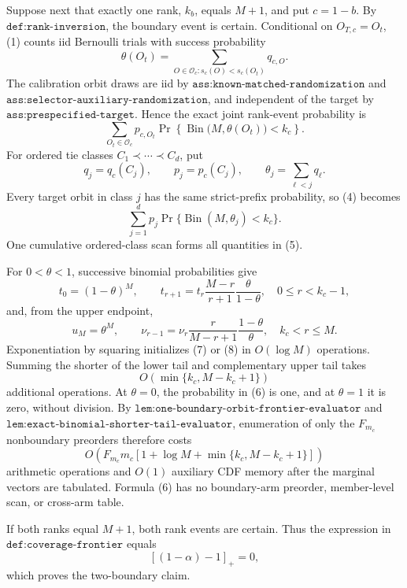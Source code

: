 Suppose next that exactly one rank, \(k_b\), equals \(M+1\), and put \(c=1-b\). By \(\texttt{def:rank-inversion}\), the boundary event is certain. Conditional on \(O_{T,c}=O_t\), (1) counts iid Bernoulli trials with success probability
\[
\theta(O_t)
=
\sum_{O\in\mathcal O_c:s_c(O)<s_c(O_t)}
q_{c,O}.
\tag{3}
\]
The calibration orbit draws are iid by \(\texttt{ass:known-matched-randomization}\) and \(\texttt{ass:selector-auxiliary-randomization}\), and independent of the target by \(\texttt{ass:prespecified-target}\). Hence the exact joint rank-event probability is
\[
\sum_{O_t\in\mathcal O_c}
p_{c,O_t}
\Pr\!\left\{
\operatorname{Bin}\bigl(M,\theta(O_t)\bigr)<k_c
\right\}.
\tag{4}
\]
For ordered tie classes \(C_1\prec\cdots\prec C_d\), put
\[
q_j=q_c(C_j),\qquad
p_j=p_c(C_j),\qquad
\theta_j=\sum_{\ell<j}q_\ell.
\tag{5}
\]
Every target orbit in class \(j\) has the same strict-prefix probability, so (4) becomes
\[
\sum_{j=1}^d
p_j\Pr\{\operatorname{Bin}(M,\theta_j)<k_c\}.
\tag{6}
\]
One cumulative ordered-class scan forms all quantities in (5).

For \(0<\theta<1\), successive binomial probabilities give
\[
t_0=(1-\theta)^M,\qquad
t_{r+1}
=
t_r\frac{M-r}{r+1}\frac{\theta}{1-\theta},
\quad 0\le r<k_c-1,
\tag{7}
\]
and, from the upper endpoint,
\[
u_M=\theta^M,\qquad\nu_{r-1}
=\nu_r\frac r{M-r+1}\frac{1-\theta}{\theta},
\quad k_c<r\le M.
\tag{8}
\]
Exponentiation by squaring initializes (7) or (8) in \(O(\log M)\) operations. Summing the shorter of the lower tail and complementary upper tail takes
\[
O(\min\{k_c,M-k_c+1\})
\tag{9}
\]
additional operations. At \(\theta=0\), the probability in (6) is one, and at \(\theta=1\) it is zero, without division. By \(\texttt{lem:one-boundary-orbit-frontier-evaluator}\) and \(\texttt{lem:exact-binomial-shorter-tail-evaluator}\), enumeration of only the \(F_{m_c}\) nonboundary preorders therefore costs
\[
O\!\left(
F_{m_c}m_c
[1+\log M+\min\{k_c,M-k_c+1\}]
\right)
\tag{10}
\]
arithmetic operations and \(O(1)\) auxiliary CDF memory after the marginal vectors are tabulated. Formula (6) has no boundary-arm preorder, member-level scan, or cross-arm table.

If both ranks equal \(M+1\), both rank events are certain. Thus the expression in \(\texttt{def:coverage-frontier}\) equals
\[
[(1-\alpha)-1]_+=0,
\tag{11}
\]
which proves the two-boundary claim.

